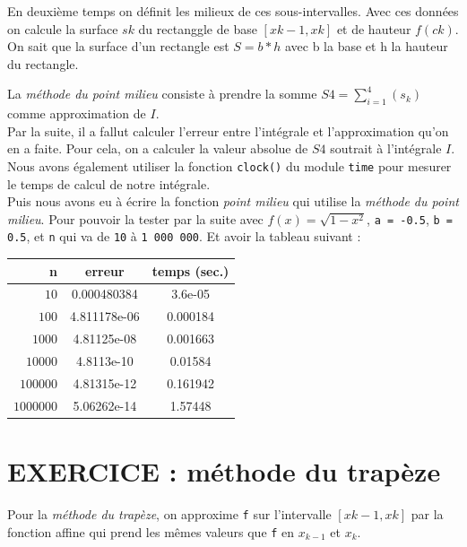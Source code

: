 \documentclass{article}
\begin{document}
En deuxième temps on définit les milieux de ces sous-intervalles. Avec ces données on calcule la surface $s{k}$ du rectanggle de base $[x{k-1},x{k}]$ et de hauteur $f(c{k})$. On sait que la surface d'un rectangle est $S= b*h$ avec b la base et h la hauteur du rectangle.

La {\it méthode du point milieu} consiste à prendre la somme $S{4}=\sum_{i=1}^{4} (s_{k})$ comme approximation de $I$.
\\

Par la suite, il a fallut calculer l'erreur entre l'intégrale et l'approximation qu'on en a faite. Pour cela, on a calculer la valeur absolue de $S{4}$ soutrait à l'intégrale $I$.
\\

Nous avons également utiliser la fonction \texttt{clock()} du module \texttt{time} pour mesurer le temps de calcul de notre intégrale. 
\\

Puis nous avons eu à écrire la fonction {\it point milieu} qui utilise la {\it méthode du point milieu}. Pour pouvoir la tester par la suite avec $f(x) = \sqrt{1 - x^2}$, \texttt{a = -0.5}, \texttt{b = 0.5}, et \texttt{n} qui va de \texttt{10} à \texttt{1 000 000}. Et avoir la tableau suivant :
\\

\begin{center}
\begin{tabular}{r | c | c}
{n} & erreur & temps (sec.)\\
\hline
$10$ & {0.000480384} & {3.6e-05}\\
$100$ & {4.811178e-06} & {0.000184}\\
$1000$ & {4.81125e-08} & {0.001663}\\
$10000$ & {4.8113e-10} & {0.01584}\\
$100000$ & {4.81315e-12} & {0.161942}\\
$1000000$ & {5.06262e-14} & {1.57448}
\end{tabular}
\end{center}

\section{EXERCICE : méthode du trapèze}

	Pour la\textit{ méthode du trapèze}, on approxime \texttt{f} sur l'intervalle $[x{k-1},x{k}]$ par la fonction affine qui prend les mêmes valeurs que \texttt{f} en $x_{k-1}$ et $x_k$.\\
\end{document}
